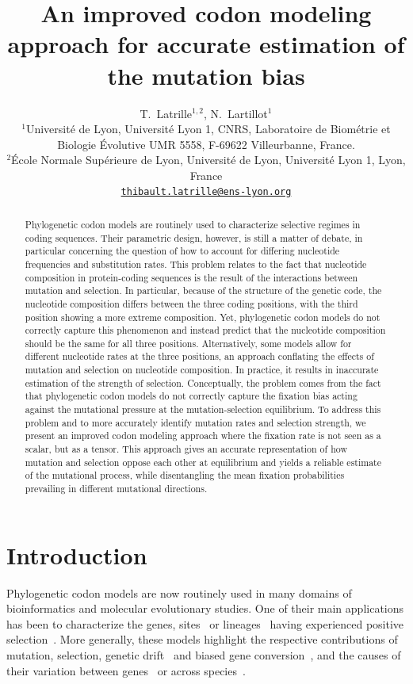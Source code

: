 \documentclass{article}
\title{An improved codon modeling approach for accurate estimation of the mutation bias}
\author{
 \large
 T.~{Latrille}$^{1,2}$, N.~{Lartillot}$^{1}$ \\
 \normalsize
	$^{1}$Université de Lyon, Université Lyon 1, CNRS, Laboratoire de Biométrie et Biologie Évolutive UMR 5558, F-69622 Villeurbanne, France.\\
	$^{2}$École Normale Supérieure de Lyon, Université de Lyon, Université Lyon 1, Lyon, France\\
	\texttt{\href{mailto:thibault.latrille@ens-lyon.org}{thibault.latrille@ens-lyon.org}} \\
}
\begin{document}
\maketitle

\begin{abstract}
Phylogenetic codon models are routinely used to characterize selective regimes in coding sequences. Their parametric design, however, is still a matter of debate, in particular concerning the question of how to account for differing nucleotide frequencies and substitution rates. This problem relates to the fact that nucleotide composition in protein-coding sequences is the result of the interactions between mutation and selection. In particular, because of the structure of the genetic code, the nucleotide composition differs between the three coding positions, with the third position showing a more extreme composition. Yet, phylogenetic codon models do not correctly capture this phenomenon and instead predict that the nucleotide composition should be the same for all three positions. Alternatively, some models allow for different nucleotide rates at the three positions, an approach conflating the effects of mutation and selection on nucleotide composition. In practice, it results in inaccurate estimation of the strength of selection. Conceptually, the problem comes from the fact that phylogenetic codon models do not correctly capture the fixation bias acting against the mutational pressure at the mutation-selection equilibrium. To address this problem and to more accurately identify mutation rates and selection strength, we present an improved codon modeling approach where the fixation rate is not seen as a scalar, but as a tensor. This approach gives an accurate representation of how mutation and selection oppose each other at equilibrium and yields a reliable estimate of the mutational process, while disentangling the mean fixation probabilities prevailing in different mutational directions. 
\end{abstract}


\section{Introduction}

Phylogenetic codon models are now routinely used in many domains of bioinformatics and molecular evolutionary studies.
One of their main applications has been to characterize the genes, sites~\citep{Nielsen1998, Yang2005, Murrell2012} or lineages~\citep{Zhang2004, Pond2011} having experienced positive selection~\citep{Murrell2015, Enard2016}.
More generally, these models highlight the respective contributions of mutation, selection, genetic drift~\citep{Teufel2018} and biased gene conversion~\citep{Pouyet2019, Kosiol2019}, and the causes of their variation between genes~\citep{Zhang2015} or across species~\citep{Seo2004, Popadin2007, Lartillot2011}.
\end{document}
